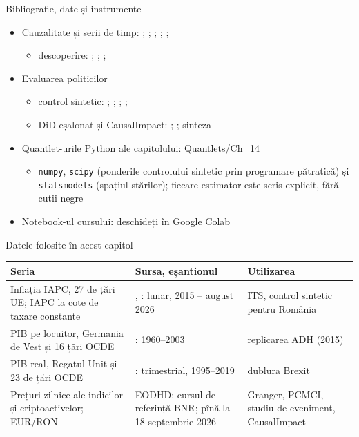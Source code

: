 \begin{frame}{Bibliografie, date și instrumente}
\itemsize{\small}
\begin{itemize}
    \item Cauzalitate și serii de timp: ; ; ; ; ; 
    \begin{itemize}
        \item descoperire: ; ; ; 
    \end{itemize}
    \item Evaluarea politicilor
    \begin{itemize}
        \item control sintetic: ; ; ; ; 
        \item DiD eșalonat și CausalImpact: ; ; sinteza 
    \end{itemize}
    \item Quantlet-urile Python ale capitolului: \href{https://github.com/danpele/Advanced-Time-Series/tree/main/Quantlets/Ch_14}{Quantlets/Ch\_14}
    \begin{itemize}
        \item \texttt{numpy}, \texttt{scipy} (ponderile controlului sintetic prin programare pătratică) și \texttt{statsmodels} (spațiul stărilor); fiecare estimator este scris explicit, fără cutii negre
    \end{itemize}
    \item Notebook-ul cursului: \href{\colaburl{notebooks/EN/chapter14_lecture_notebook.ipynb}}{deschideți în Google Colab}
\end{itemize}
\end{frame}

\begin{frame}{Datele folosite în acest capitol}
\itemsize{\footnotesize}
\begin{center}
\scriptsize
\begin{tabular}{>{\raggedright\arraybackslash}p{3.3cm}>{\raggedright\arraybackslash}p{5.6cm}>{\raggedright\arraybackslash}p{3.4cm}}
\toprule
\textbf{Seria} & \textbf{Sursa, eșantionul} & \textbf{Utilizarea} \\
\midrule
Inflația IAPC, 27 de țări UE; IAPC la cote de taxare constante & , : lunar, 2015 -- august 2026 & ITS, control sintetic pentru România \\
PIB pe locuitor, Germania de Vest și 16 țări OCDE & : 1960--2003 & replicarea ADH (2015) \\
PIB real, Regatul Unit și 23 de țări OCDE & : trimestrial, 1995--2019 & dublura Brexit \\
Prețuri zilnice ale indicilor și criptoactivelor; EUR/RON & EODHD; cursul de referință BNR; pînă la 18 septembrie 2026 & Granger, PCMCI, studiu de eveniment, CausalImpact \\
\bottomrule
\end{tabular}
\end{center}
\end{frame}


